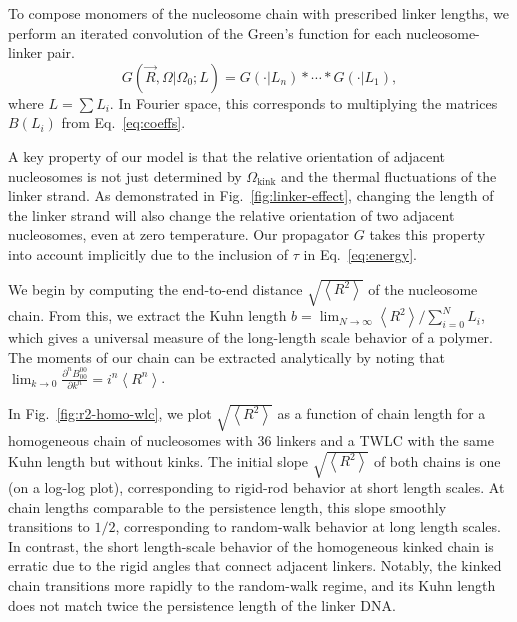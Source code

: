 \documentclass[%
 reprint,
superscriptaddress,
showpacs,preprintnumbers,
 amsmath,amssymb,
 aps,
 prl,
]{revtex4-1}
\newcommand{\greens}[2][\Omega_0; L]{G(#2|#1)}
\newcommand{\RR}{\left\langle{}R^2\right\rangle{}}
\begin{document}
To compose monomers of the nucleosome chain with prescribed linker lengths, we
    perform an iterated convolution of the Green's function for each
    nucleosome-linker pair.
    \begin{equation}\label{eq:conv}
        \greens{\vec{R},\Omega} = \greens[L_n]{\cdot} * \cdots{} * \greens[L_1]{\cdot},
    \end{equation}%
    where $L = \sum L_i$.
In Fourier space, this corresponds to multiplying the matrices $B(L_i)$
    from Eq.~\ref{eq:coeffs}.

A key property of our model is that the relative orientation of adjacent
    nucleosomes is not just determined by $\Omega_\text{kink}$ and the thermal
    fluctuations of the linker strand.
As demonstrated in Fig.~\ref{fig:linker-effect}, changing the length of the
    linker strand will also change the relative orientation of two adjacent
    nucleosomes, even at zero temperature.
Our propagator $G$ takes this property into account implicitly due to the inclusion of $\tau$
    in Eq.~\ref{eq:energy}.



We begin by computing the end-to-end distance $\sqrt{\RR}$ of the nucleosome
    chain.
From this, we extract the Kuhn length $b = \lim_{N\to\infty} \RR/\sum_{i=0}^N L_i$,
    which gives a universal measure of the long-length scale behavior of a polymer.
The moments of our chain can be extracted analytically by noting that
    $\lim_{k\to0} \frac{\partial^{n} B_{00}^{00}}{\partial k^{n}} = i^n \left\langle
    R^n\right\rangle$.

In Fig.~\ref{fig:r2-homo-wlc}, we plot $\sqrt{\RR}$ as a function of chain
    length for a homogeneous chain of nucleosomes with \SI{36}{\basepair}
    linkers and a TWLC with the same Kuhn length but without kinks.
The initial slope $\sqrt{\RR}$ of both chains is one (on a log-log plot),
    corresponding to rigid-rod behavior at short length scales.
At chain lengths comparable to the persistence length, this slope smoothly
    transitions to $1/2$, corresponding to random-walk behavior at long length
    scales.
In contrast, the short length-scale behavior of the homogeneous kinked chain is
    erratic due to the rigid angles that connect adjacent linkers.
Notably, the kinked chain transitions more rapidly to the random-walk regime,
    and its Kuhn length does not match twice the persistence length of the
    linker DNA\@.
\end{document}

